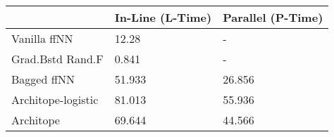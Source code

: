 \begin{tabular}{lll}
\toprule
{} & In-Line (L-Time) & Parallel (P-Time) \\
\midrule
Vanilla ffNN       &            12.28 &                 - \\
Grad.Bstd Rand.F   &            0.841 &                 - \\
Bagged ffNN        &           51.933 &            26.856 \\
Architope-logistic &           81.013 &            55.936 \\
Architope          &           69.644 &            44.566 \\
\bottomrule
\end{tabular}
